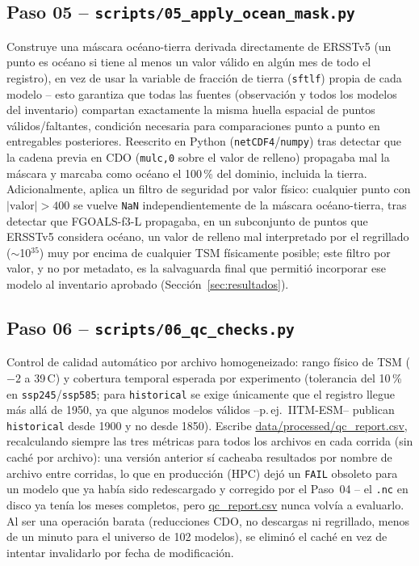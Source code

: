 \documentclass[11pt,a4paper]{article}
\newcommand{\archivo}[1]{\begingroup\hypersetup{urlcolor=black}\url{#1}\endgroup}
\begin{document}
\subsection{Paso 05 -- \texttt{scripts/05\_apply\_ocean\_mask.py}}
\label{sec:paso05}
Construye una m\'ascara oc\'eano-tierra derivada directamente de ERSSTv5 (un punto es oc\'eano si tiene al menos un valor v\'alido en alg\'un mes de todo el registro), en vez de usar la variable de fracci\'on de tierra (\texttt{sftlf}) propia de cada modelo -- esto garantiza que todas las fuentes (observaci\'on y todos los modelos del inventario) compartan exactamente la misma huella espacial de puntos v\'alidos/faltantes, condici\'on necesaria para comparaciones punto a punto en entregables posteriores. Reescrito en Python (\texttt{netCDF4}/\texttt{numpy}) tras detectar que la cadena previa en CDO (\texttt{mulc,0} sobre el valor de relleno) propagaba mal la m\'ascara y marcaba como oc\'eano el 100\,\% del dominio, incluida la tierra. Adicionalmente, aplica un filtro de seguridad por valor f\'isico: cualquier punto con $|\text{valor}| > 400$ se vuelve \texttt{NaN} independientemente de la m\'ascara oc\'eano-tierra, tras detectar que FGOALS-f3-L propagaba, en un subconjunto de puntos que ERSSTv5 considera oc\'eano, un valor de relleno mal interpretado por el regrillado ($\sim$10$^{35}$) muy por encima de cualquier TSM f\'isicamente posible; este filtro por valor, y no por metadato, es la salvaguarda final que permiti\'o incorporar ese modelo al inventario aprobado (Secci\'on~\ref{sec:resultados}).

\subsection{Paso 06 -- \texttt{scripts/06\_qc\_checks.py}}
\label{sec:paso06}
Control de calidad autom\'atico por archivo homogeneizado: rango f\'isico de TSM ($-2$ a 39\,\textdegree C) y cobertura temporal esperada por experimento (tolerancia del 10\,\% en \texttt{ssp245}/\texttt{ssp585}; para \texttt{historical} se exige \'unicamente que el registro llegue m\'as all\'a de 1950, ya que algunos modelos v\'alidos --p.\,ej.\ IITM-ESM-- publican \texttt{historical} desde 1900 y no desde 1850). Escribe \archivo{data/processed/qc_report.csv}, recalculando siempre las tres m\'etricas para todos los archivos en cada corrida (sin cach\'e por archivo): una versi\'on anterior s\'i cacheaba resultados por nombre de archivo entre corridas, lo que en producci\'on (HPC) dej\'o un \texttt{FAIL} obsoleto para un modelo que ya hab\'ia sido redescargado y corregido por el Paso~04 -- el \texttt{.nc} en disco ya ten\'ia los meses completos, pero \archivo{qc_report.csv} nunca volv\'ia a evaluarlo. Al ser una operaci\'on barata (reducciones CDO, no descargas ni regrillado, menos de un minuto para el universo de 102 modelos), se elimin\'o el cach\'e en vez de intentar invalidarlo por fecha de modificaci\'on.
\end{document}
